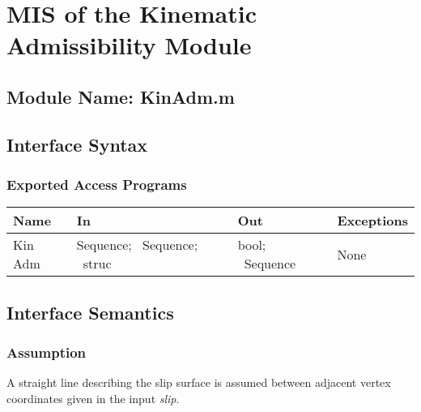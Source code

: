 \documentclass[12pt, titlepage]{article}
\begin{document}

\section{MIS of the Kinematic Admissibility
  Module} \label{sec:KinAdmMod}

\subsection{Module Name: KinAdm.m}

\subsection{Interface Syntax}

\subsubsection{Exported Access Programs}
\begin{center}
\renewcommand*{\arraystretch}{1.5}
\begin{tabular}{| p{} | p{} | 
p{} | p{} |} \hline 

  \textbf{Name} & \textbf{In} & \textbf{Out} & \textbf{Exceptions}
  \\ \hline

  Kin Adm & Sequence; ~\newline Sequence; ~\newline struc & bool;
  ~\newline Sequence & None \\ \hline

\end{tabular}
\end{center}

\subsection{Interface Semantics}

\subsubsection{Assumption}
A straight line describing the slip surface is assumed between
adjacent vertex coordinates given in the input \textit{slip}.
\end{document}
